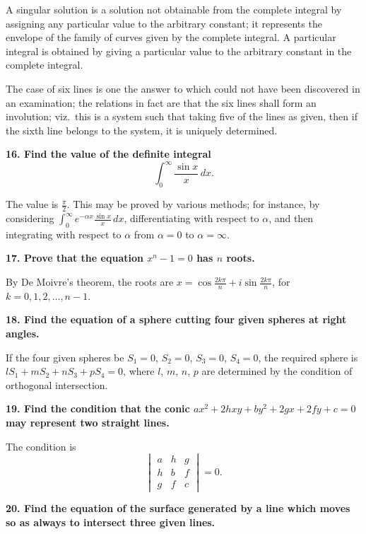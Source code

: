 \documentclass[11pt,a4paper]{book}
\begin{document}
A singular solution is a solution not obtainable from the complete integral by assigning any particular value to the arbitrary constant; it represents the envelope of the family of curves given by the complete integral. A particular integral is obtained by giving a particular value to the arbitrary constant in the complete integral.

The case of six lines is one the answer to which could not have been discovered in an examination; the relations in fact are that the six lines shall form an involution; viz.\ this is a system such that taking five of the lines as given, then if the sixth line belongs to the system, it is uniquely determined.

\smallskip

\noindent\textbf{16. Find the value of the definite integral}
\[
\int_0^{\infty} \frac{\sin x}{x}\, dx.
\]

The value is $\frac{\pi}{2}$. This may be proved by various methods; for instance, by considering $\int_0^{\infty} e^{-\alpha x} \frac{\sin x}{x}\, dx$, differentiating with respect to $\alpha$, and then integrating with respect to $\alpha$ from $\alpha = 0$ to $\alpha = \infty$.

\smallskip

\noindent\textbf{17. Prove that the equation $x^n - 1 = 0$ has $n$ roots.}

By De Moivre's theorem, the roots are $x = \cos \frac{2k\pi}{n} + i \sin \frac{2k\pi}{n}$, for $k = 0, 1, 2, \ldots, n-1$.

\smallskip

\noindent\textbf{18. Find the equation of a sphere cutting four given spheres at right angles.}

If the four given spheres be $S_1 = 0$, $S_2 = 0$, $S_3 = 0$, $S_4 = 0$, the required sphere is $lS_1 + mS_2 + nS_3 + pS_4 = 0$, where $l$, $m$, $n$, $p$ are determined by the condition of orthogonal intersection.

\smallskip

\noindent\textbf{19. Find the condition that the conic $ax^2 + 2hxy + by^2 + 2gx + 2fy + c = 0$ may represent two straight lines.}

The condition is
\[
\begin{vmatrix}
a & h & g \\
h & b & f \\
g & f & c
\end{vmatrix} = 0.
\]

\smallskip

\noindent\textbf{20. Find the equation of the surface generated by a line which moves so as always to intersect three given lines.}
\end{document}
